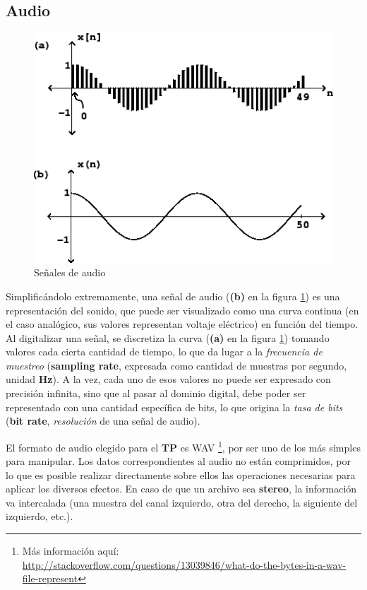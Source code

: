 \subsection{Audio}
\label{subsec:intro-audio}

\begin{figure}[H]
    \centering
    \includegraphics[scale=0.6]{imagenes/signals.png}
    \caption{Señales de audio}
    \label{fig:signals}
\end{figure}

Simplificándolo extremamente, una señal de audio (\textbf{(b)} en la figura \ref{fig:signals}) es una representación del sonido, que puede ser visualizado como una curva continua (en el caso analógico, sus valores representan voltaje eléctrico) en función del tiempo. Al digitalizar una señal, se discretiza la curva (\textbf{(a)} en la figura \ref{fig:signals}) tomando valores cada cierta cantidad de tiempo, lo que da lugar a la \textit{frecuencia de muestreo} (\textbf{sampling rate}, expresada como cantidad de muestras por segundo, unidad \textbf{Hz}). A la vez, cada uno de esos valores no puede ser expresado con precisión infinita, sino que al pasar al dominio digital, debe poder ser representado con una cantidad específica de bits, lo que origina la \textit{tasa de bits} (\textbf{bit rate}, \textit{resolución} de una señal de audio). \vspace{\baselineskip}

El formato de audio elegido para el \textbf{TP} es WAV \footnote{Más información aquí: \\ \url{http://stackoverflow.com/questions/13039846/what-do-the-bytes-in-a-wav-file-represent}}, por ser uno de los más simples para manipular. Los datos correspondientes al audio no están comprimidos, por lo que es posible realizar directamente sobre ellos las operaciones necesarias para aplicar los diversos efectos. En caso de que un archivo sea \textbf{stereo}, la información va intercalada (una muestra del canal izquierdo, otra del derecho, la siguiente del izquierdo, etc.).\vspace{\baselineskip}

